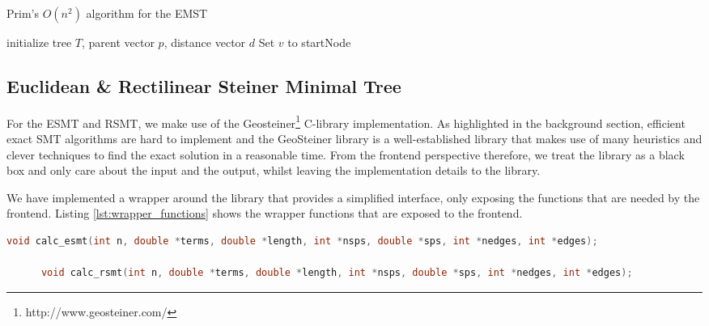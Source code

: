 \documentclass{l4proj}
\begin{document}
\begin{algorithm}
      \caption{Prim's $O(n^2)$ algorithm for the EMST}
      \label{alg:emst}
      \SetAlgoLined
      initialize tree $T$, parent vector $p$, distance vector $d$\;
      Set $v$ to startNode\;
      \;
\end{algorithm}

\subsection{Euclidean \& Rectilinear Steiner Minimal Tree}
For the ESMT and RSMT, we make use of the Geosteiner\footnote{http://www.geosteiner.com/} C-library implementation. As highlighted in the background section, efficient exact SMT algorithms are hard to implement and the GeoSteiner library is a well-established library that makes use of many heuristics and clever techniques to find the exact solution in a reasonable time.
From the frontend perspective therefore, we treat the library as a black box and only care about the input and the output, whilst leaving the implementation details to the library.

We have implemented a wrapper around the library that provides a simplified interface, only exposing the functions that are needed by the frontend. Listing \ref{lst:wrapper_functions} shows the wrapper functions that are exposed to the frontend.

\begin{lstlisting}[language=C,caption=Wrapper functions for the Geosteiner library,label=lst:wrapper_functions]
      void calc_esmt(int n, double *terms, double *length, int *nsps, double *sps, int *nedges, int *edges);

      void calc_rsmt(int n, double *terms, double *length, int *nsps, double *sps, int *nedges, int *edges);
\end{lstlisting}
\end{document}
